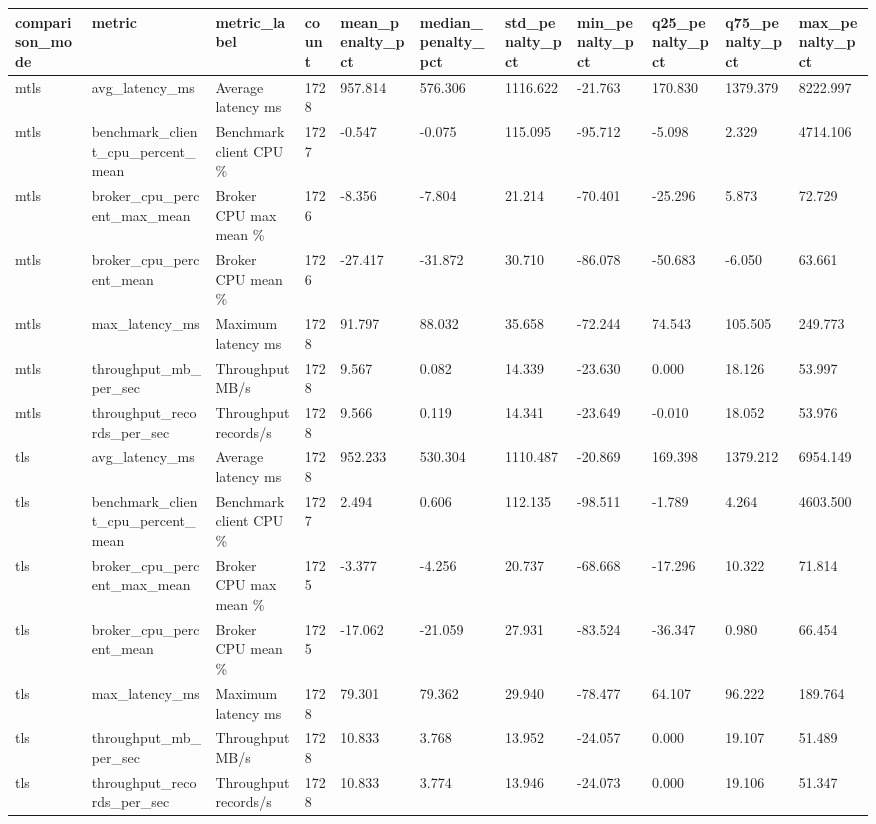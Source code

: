 \begin{tabular}{lllllllllll}
\hline
comparison\_mode & metric & metric\_label & count & mean\_penalty\_pct & median\_penalty\_pct & std\_penalty\_pct & min\_penalty\_pct & q25\_penalty\_pct & q75\_penalty\_pct & max\_penalty\_pct \\
\hline
mtls & avg\_latency\_ms & Average latency ms & 1728 & 957.814 & 576.306 & 1116.622 & -21.763 & 170.830 & 1379.379 & 8222.997 \\
mtls & benchmark\_client\_cpu\_percent\_mean & Benchmark client CPU \% & 1727 & -0.547 & -0.075 & 115.095 & -95.712 & -5.098 & 2.329 & 4714.106 \\
mtls & broker\_cpu\_percent\_max\_mean & Broker CPU max mean \% & 1726 & -8.356 & -7.804 & 21.214 & -70.401 & -25.296 & 5.873 & 72.729 \\
mtls & broker\_cpu\_percent\_mean & Broker CPU mean \% & 1726 & -27.417 & -31.872 & 30.710 & -86.078 & -50.683 & -6.050 & 63.661 \\
mtls & max\_latency\_ms & Maximum latency ms & 1728 & 91.797 & 88.032 & 35.658 & -72.244 & 74.543 & 105.505 & 249.773 \\
mtls & throughput\_mb\_per\_sec & Throughput MB/s & 1728 & 9.567 & 0.082 & 14.339 & -23.630 & 0.000 & 18.126 & 53.997 \\
mtls & throughput\_records\_per\_sec & Throughput records/s & 1728 & 9.566 & 0.119 & 14.341 & -23.649 & -0.010 & 18.052 & 53.976 \\
tls & avg\_latency\_ms & Average latency ms & 1728 & 952.233 & 530.304 & 1110.487 & -20.869 & 169.398 & 1379.212 & 6954.149 \\
tls & benchmark\_client\_cpu\_percent\_mean & Benchmark client CPU \% & 1727 & 2.494 & 0.606 & 112.135 & -98.511 & -1.789 & 4.264 & 4603.500 \\
tls & broker\_cpu\_percent\_max\_mean & Broker CPU max mean \% & 1725 & -3.377 & -4.256 & 20.737 & -68.668 & -17.296 & 10.322 & 71.814 \\
tls & broker\_cpu\_percent\_mean & Broker CPU mean \% & 1725 & -17.062 & -21.059 & 27.931 & -83.524 & -36.347 & 0.980 & 66.454 \\
tls & max\_latency\_ms & Maximum latency ms & 1728 & 79.301 & 79.362 & 29.940 & -78.477 & 64.107 & 96.222 & 189.764 \\
tls & throughput\_mb\_per\_sec & Throughput MB/s & 1728 & 10.833 & 3.768 & 13.952 & -24.057 & 0.000 & 19.107 & 51.489 \\
tls & throughput\_records\_per\_sec & Throughput records/s & 1728 & 10.833 & 3.774 & 13.946 & -24.073 & 0.000 & 19.106 & 51.347 \\
\hline
\end{tabular}
